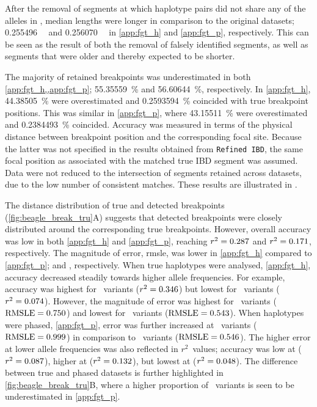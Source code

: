 After the removal of segments at which haplotype pairs did not share any of the alleles in \fk{[2,25]}, median lengths were longer in comparison to the original datasets; \SI{0.255496}{\mega\basepair} and \SI{0.256070}{\mega\basepair} in \ref{app:fgt_h} and \ref{app:fgt_p}, respectively.
This can be seen as the result of both the removal of falsely identified segments, as well as segments that were older and thereby expected to be shorter.

%

%

The majority of retained breakpoints was underestimated in both \cref{app:fgt_h,,app:fgt_p}; \SI{55.35559}{\percent} and \SI{56.60644}{\percent}, respectively.
In \cref{app:fgt_h}, \SI{44.38505}{\percent} were overestimated and \SI{0.2593594}{\percent} coincided with true breakpoint positions.
This was similar in \cref{app:fgt_p}, where \SI{43.15511}{\percent} were overestimated and \SI{0.2384493}{\percent} coincided.
Accuracy was measured in terms of the physical distance between breakpoint position and the corresponding focal site.
Because the latter was not specified in the results obtained from \texttt{Refined\,IBD}, the same focal position as associated with the matched true IBD segment was assumed.
Data were not reduced to the intersection of segments retained across datasets, due to the low number of consistent matches.
These results are illustrated in .

The distance distribution of true and detected breakpoints (\cref{fig:beagle_break_tru}{A}) suggests that detected breakpoints were closely distributed around the corresponding true breakpoints.
However, overall accuracy was low in both \ref{app:fgt_h} and \ref{app:fgt_p}, reaching ${r^2 = \dec{0.2868218}}$ and ${r^2 = \dec{0.1707155}}$, respectively.
The magnitude of error, \gls{rmsle}, was lower in \ref{app:fgt_h} compared to \ref{app:fgt_p};  and , respectively.
When true haplotypes were analysed, \cref{app:fgt_h}, accuracy decreased steadily towards higher allele frequencies.
For example, accuracy was highest for ~variants (${r^2 = \dec{0.34591189}}$) but lowest for ~variants (${r^2 = \dec{0.07445725}}$).
However, the magnitude of error was highest for ~variants (${\rmsle = \dec{0.7498976}}$) and lowest for ~variants (${\rmsle = \dec{0.5433645}}$).
When haplotypes were phased, \cref{app:fgt_p}, error was further increased at ~variants (${\rmsle = \dec{0.999}}$) in comparison to ~variants (${\rmsle = \dec{0.5456303}}$).
The higher error at lower allele frequencies was also reflected in $r^2$~values; \eg accuracy was low at  (${r^2 = \dec{0.08720971}}$), higher at  (${r^2 = \dec{0.13222751}}$), but lowest at  (${r^2 = \dec{0.04827430}}$).
The difference between true and phased datasets is further highlighted in  \cref{fig:beagle_break_tru}{B}, where a higher proportion of ~variants is seen to be underestimated in \ref{app:fgt_p}.

